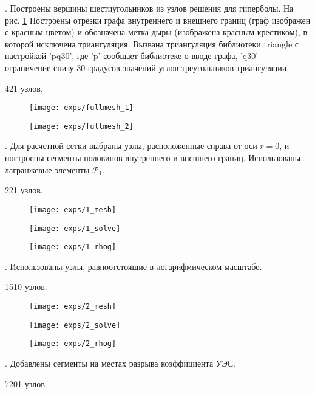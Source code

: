 
 \theexp \label{text_fullmesh}.
Построены вершины шестиугольников из узлов решения для гиперболы.
На рис. \ref{fig:fullmesh} Построены отрезки графа внутреннего и внешнего границ (граф изображен с красным цветом)
и обозначена метка дыры (изображена красным крестиком), в которой исключена триангуляция.
Вызвана триангуляция библиотеки triangle с настройкой 'pq30',
где 'p' сообщает библиотеке о вводе графа, 'q30' --- ограничение снизу 30 градусов значений углов треугольников триангуляции.

421 узлов.

\begin{figure}[H]
  \texttt{[image: exps/fullmesh\_1]}
\end{figure}
\begin{figure}[H]
  \texttt{[image: exps/fullmesh\_2]}
  \caption{} \label{fig:fullmesh}
\end{figure}

 \theexp.
Для расчетной сетки выбраны узлы, расположенные справа от оси ${r = 0}$,
и построены сегменты половинов внутреннего и внешнего границ.
Использованы лагранжевые элементы ${\mathcal{P}_1}$.

221 узлов.

\begin{figure}[H]
  \texttt{[image: exps/1\_mesh]}
\end{figure}
\begin{figure}[H]
  \texttt{[image: exps/1\_solve]}
\end{figure}
\begin{figure}[H]
  \texttt{[image: exps/1\_rhog]}
\end{figure}

 \theexp.
Использованы узлы, равноотстоящие в логарифмическом масштабе.

1510 узлов.

\begin{figure}[H]
  \texttt{[image: exps/2\_mesh]}
\end{figure}
\begin{figure}[H]
  \texttt{[image: exps/2\_solve]}
\end{figure}
\begin{figure}[H]
  \texttt{[image: exps/2\_rhog]}
\end{figure}

 \theexp.
Добавлены сегменты на местах разрыва коэффициента УЭС.

7201 узлов.

